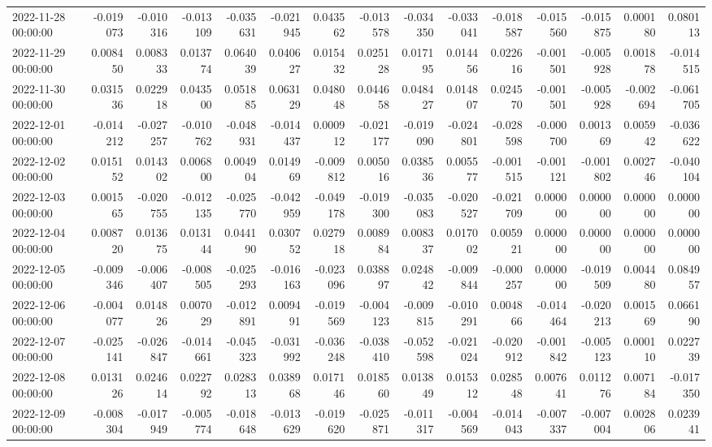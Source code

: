 \begin{tabular}{lrrrrrrrrrrrrrr}
2022-11-28 00:00:00 & -0.019073 & -0.010316 & -0.013109 & -0.035631 & -0.021945 & 0.043562 & -0.013578 & -0.034350 & -0.033041 & -0.018587 & -0.015560 & -0.015875 & 0.000180 & 0.080113 \\
2022-11-29 00:00:00 & 0.008450 & 0.008333 & 0.013774 & 0.064039 & 0.040627 & 0.015432 & 0.025128 & 0.017195 & 0.014456 & 0.022616 & -0.001501 & -0.005928 & 0.001878 & -0.014515 \\
2022-11-30 00:00:00 & 0.031536 & 0.022918 & 0.043500 & 0.051885 & 0.063129 & 0.048048 & 0.044658 & 0.048427 & 0.014807 & 0.024570 & -0.001501 & -0.005928 & -0.002694 & -0.061705 \\
2022-12-01 00:00:00 & -0.014212 & -0.027257 & -0.010762 & -0.048931 & -0.014437 & 0.000912 & -0.021177 & -0.019090 & -0.024801 & -0.028598 & -0.000700 & 0.001369 & 0.005942 & -0.036622 \\
2022-12-02 00:00:00 & 0.015152 & 0.014302 & 0.006800 & 0.004904 & 0.014969 & -0.009812 & 0.005016 & 0.038536 & 0.005577 & -0.001515 & -0.001121 & -0.001802 & 0.002746 & -0.040104 \\
2022-12-03 00:00:00 & 0.001565 & -0.020755 & -0.012135 & -0.025770 & -0.042959 & -0.049178 & -0.019300 & -0.035083 & -0.020527 & -0.021709 & 0.000000 & 0.000000 & 0.000000 & 0.000000 \\
2022-12-04 00:00:00 & 0.008720 & 0.013675 & 0.013144 & 0.044190 & 0.030752 & 0.027918 & 0.008984 & 0.008337 & 0.017002 & 0.005921 & 0.000000 & 0.000000 & 0.000000 & 0.000000 \\
2022-12-05 00:00:00 & -0.009346 & -0.006407 & -0.008505 & -0.025293 & -0.016163 & -0.023096 & 0.038897 & 0.024842 & -0.009844 & -0.000257 & 0.000000 & -0.019509 & 0.004480 & 0.084957 \\
2022-12-06 00:00:00 & -0.004077 & 0.014826 & 0.007029 & -0.012891 & 0.009491 & -0.019569 & -0.004123 & -0.009815 & -0.010291 & 0.004866 & -0.014464 & -0.020213 & 0.001569 & 0.066190 \\
2022-12-07 00:00:00 & -0.025141 & -0.026847 & -0.014661 & -0.045323 & -0.031992 & -0.036248 & -0.038410 & -0.052598 & -0.021024 & -0.020912 & -0.001842 & -0.005123 & 0.000110 & 0.022739 \\
2022-12-08 00:00:00 & 0.013126 & 0.024614 & 0.022792 & 0.028313 & 0.038968 & 0.017146 & 0.018560 & 0.013849 & 0.015312 & 0.028548 & 0.007641 & 0.011276 & 0.007184 & -0.017350 \\
2022-12-09 00:00:00 & -0.008304 & -0.017949 & -0.005774 & -0.018648 & -0.013629 & -0.019620 & -0.025871 & -0.011317 & -0.004569 & -0.014043 & -0.007337 & -0.007004 & 0.002806 & 0.023941 \\

\end{tabular}
